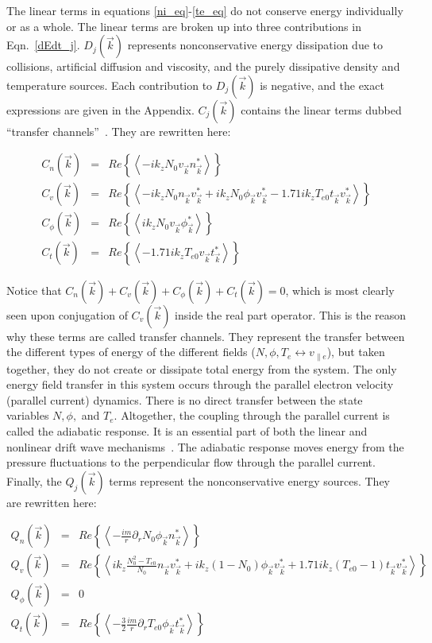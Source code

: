 \documentclass[showpacs,preprintnumbers,amsmath,amssymb,superscriptaddress]{revtex4}
\def\beqar{\begin{eqnarray}}
\def\eeqar{\end{eqnarray}}
\def\para{\parallel}
\newcommand{\pdr}{\partial_r}
\begin{document}
The linear terms in equations \ref{ni_eq}-\ref{te_eq} do not conserve energy individually or as a whole. The linear terms are broken up into three contributions in Eqn.~\ref{dEdt_j}.
$D_{j}(\vec{k})$ represents nonconservative energy dissipation due to collisions, artificial diffusion and viscosity, and the purely dissipative density and temperature sources.
Each contribution to $D_j(\vec{k})$ is negative, and the exact expressions are given in the Appendix. 
$C_j(\vec{k})$ contains the linear terms dubbed ``transfer channels''~\cite{scott2002}. They are rewritten here:

\beqar
C_n(\vec{k}) & = & Re \left\{ \left< - i k_z N_0 v_{\vec{k}} n_{\vec{k}}^* \right> \right\}
\label{Cnk} \\
C_v(\vec{k}) & = & Re \left\{ \left< - i k_z N_0 n_{\vec{k}} v_{\vec{k}}^* + i k_z N_0 \phi_{\vec{k}} v_{\vec{k}}^*  - 1.71 i k_z T_{e0} t_{\vec{k}} v_{\vec{k}}^*  \right> \right\}
\label{Cvk} \\
C_\phi(\vec{k}) & = & Re \left\{ \left< i k_z N_0 v_{\vec{k}} \phi_{\vec{k}}^* \right> \right\}
\label{Cpk} \\
C_t(\vec{k}) & = & Re \left\{ \left< - 1.71 i k_z T_{e0} v_{\vec{k}} t_{\vec{k}}^* \right> \right\}
\label{Ctk}
\eeqar

Notice that $C_n(\vec{k}) + C_v(\vec{k}) + C_\phi(\vec{k}) + C_t(\vec{k}) = 0$, which is most clearly seen upon conjugation of $C_v(\vec{k})$ inside the real part operator.
This is the reason why these terms are called transfer channels. They represent the transfer
between the different types of energy of the different fields ($N,\phi,T_e \leftrightarrow v_{\para e}$), but taken together, they do not create or dissipate total
energy from the system. The only energy field transfer in this system occurs through the parallel electron velocity (parallel current) dynamics. There is no direct transfer between
the state variables $N, \phi,$ and $T_e$.  Altogether, the coupling through the parallel current is called the
adiabatic response. It is an essential part of both the linear and nonlinear
drift wave mechanisms~\cite{scott2002,scott2005}. The adiabatic response moves energy from the pressure fluctuations to the perpendicular flow through the parallel current. \\

Finally, the $Q_j(\vec{k})$ terms represent the nonconservative energy sources. They are rewritten here:

\beqar
Q_n(\vec{k}) & = & Re \left\{ \left< -\frac{i m}{r} \pdr N_0 \phi_{\vec{k}} n_{\vec{k}}^*  \right> \right\}
\label{Qnk} \\
Q_v(\vec{k}) & = & Re \left\{ \left<  i k_z \frac{N_0^2 - T_{e0}}{N_0} n_{\vec{k}} v_{\vec{k}}^* + i k_z (1 - N_0) \phi_{\vec{k}} v_{\vec{k}}^* + 1.71 i k_z (T_{e0} -1) t_{\vec{k}} v_{\vec{k}}^*  \right> \right\}
\label{Qvk} \\
Q_\phi(\vec{k}) & = & 0
\label{Qpk} \\
Q_t(\vec{k}) & = & Re \left\{ \left< -\frac{3}{2} \frac{i m}{r} \pdr T_{e0} \phi_{\vec{k}} t_{\vec{k}}^*  \right> \right\}
\label{Qtk}
\eeqar
\end{document}
